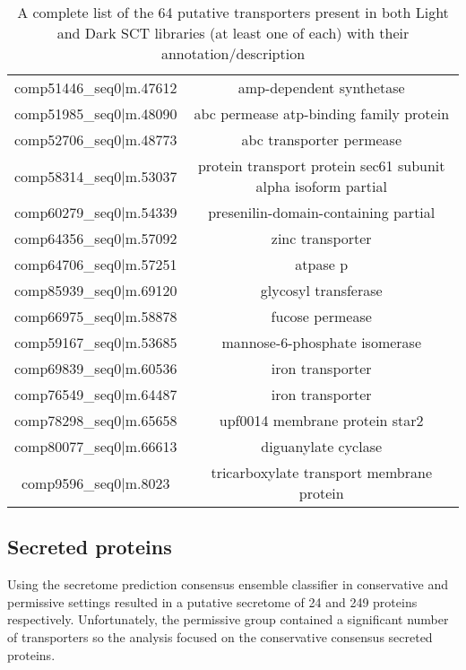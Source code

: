 \begin{table}
\begin{tabular}{|c|c|}
        comp51446\_seq0|m.47612&amp-dependent synthetase\\			
        comp51985\_seq0|m.48090&abc permease atp-binding family protein\\
        comp52706\_seq0|m.48773&abc transporter permease\\
        comp58314\_seq0|m.53037&protein transport protein sec61 subunit alpha isoform partial\\
        comp60279\_seq0|m.54339&presenilin-domain-containing partial\\
        comp64356\_seq0|m.57092&zinc transporter\\
        comp64706\_seq0|m.57251&atpase p\\
        comp85939\_seq0|m.69120&glycosyl transferase\\
        comp66975\_seq0|m.58878&fucose permease\\
        comp59167\_seq0|m.53685&mannose-6-phosphate isomerase\\
        comp69839\_seq0|m.60536&iron transporter\\
        comp76549\_seq0|m.64487&iron transporter\\
        comp78298\_seq0|m.65658&upf0014 membrane protein star2\\
        comp80077\_seq0|m.66613&diguanylate cyclase\\
        comp9596\_seq0|m.8023&tricarboxylate transport membrane protein\\
        \hline
    \end{tabular}
    \caption[List of Transporters Present in Both Light and Dark SCT Libaries]{
        A complete list of the 64 putative transporters present in both Light and Dark 
    SCT libraries (at least one of each) with their annotation/description}
\end{table}

\subsection{Secreted proteins}

Using the secretome prediction consensus ensemble classifier in conservative
and permissive settings resulted in a putative secretome
of 24 and 249 proteins respectively.  Unfortunately, the permissive
group contained a significant number of transporters so the analysis
focused on the conservative consensus secreted proteins.

